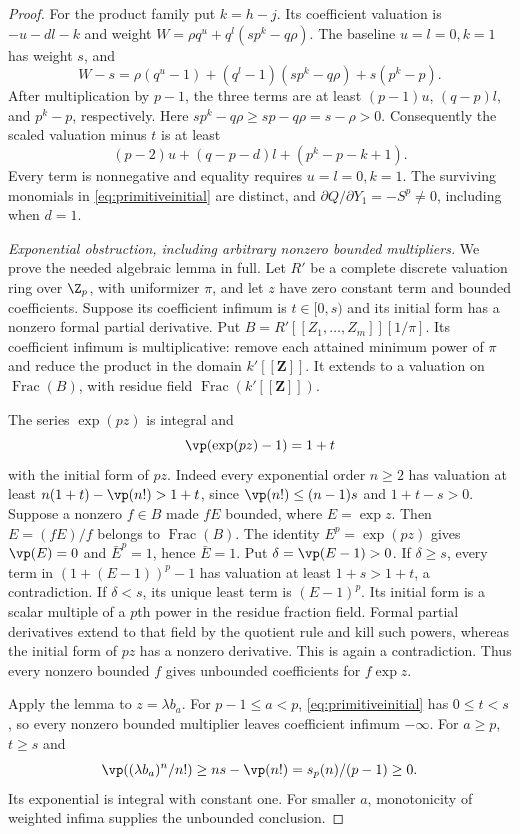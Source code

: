 \begin{proof}
For the product family put $k=h-j$. Its coefficient valuation is $-u-dl-k$ and weight
$W=\rho q^u+q^l(sp^k-q\rho)$. The baseline $u=l=0,k=1$ has weight $s$, and
\[
 W-s=\rho(q^u-1)+(q^l-1)(sp^k-q\rho)+s(p^k-p).
\]
After multiplication by $p-1$, the three terms are at least
$(p-1)u$, $(q-p)l$, and $p^k-p$, respectively. Here
$sp^k-q\rho\ge sp-q\rho=s-\rho>0$.
Consequently the scaled valuation minus $t$ is at least
\[
 (p-2)u+(q-p-d)l+(p^k-p-k+1).
\]
Every term is nonnegative and equality requires $u=l=0,k=1$.
The surviving monomials in \eqref{eq:primitiveinitial} are distinct, and
$\partial Q/\partial Y_1=-S^p\ne0$, including when $d=1$.

\emph{Exponential obstruction, including arbitrary nonzero bounded multipliers.}
We prove the needed algebraic lemma in full. Let $R'$ be a complete discrete valuation ring over $\Z_p$, with uniformizer $\pi$, and let $z$ have zero constant term and bounded coefficients. Suppose its coefficient infimum is $t\in[0,s)$ and its initial form has a nonzero formal partial derivative. Put
$B=R'[[Z_1,\ldots,Z_m]][1/\pi]$.
Its coefficient infimum is multiplicative: remove each attained minimum power of $\pi$ and reduce the product in the domain $k'[[\mathbf Z]]$. It extends to a valuation on $\operatorname{Frac}(B)$, with residue field $\operatorname{Frac}(k'[[\mathbf Z]])$.

The series $\exp(pz)$ is integral and
\[
 \vp(\exp(pz)-1)=1+t
\]
with the initial form of $pz$. Indeed every exponential order $n\ge2$ has valuation at least $n(1+t)-\vp(n!)>1+t$, since
$\vp(n!)\le(n-1)s$ and $1+t-s>0$.
Suppose a nonzero $f\in B$ made $fE$ bounded, where $E=\exp z$.
Then $E=(fE)/f$ belongs to $\operatorname{Frac}(B)$. The identity
$E^p=\exp(pz)$ gives $\vp(E)=0$ and $\bar E^p=1$, hence $\bar E=1$.
Put $\delta=\vp(E-1)>0$. If $\delta\ge s$, every term in
$(1+(E-1))^p-1$ has valuation at least $1+s>1+t$, a contradiction.
If $\delta<s$, its unique least term is $(E-1)^p$. Its initial form is a scalar multiple of a $p$th power in the residue fraction field. Formal partial derivatives extend to that field by the quotient rule and kill such powers, whereas the initial form of $pz$ has a nonzero derivative. This is again a contradiction. Thus every nonzero bounded $f$ gives unbounded coefficients for $f\exp z$.

Apply the lemma to $z=\lambda b_a$. For $p-1\le a<p$, \eqref{eq:primitiveinitial} has $0\le t<s$, so every nonzero bounded multiplier leaves coefficient infimum $-\infty$. For $a\ge p$, $t\ge s$ and
\[
 \vp((\lambda b_a)^n/n!)\ge ns-\vp(n!)
                    =s_p(n)/(p-1)\ge0.
\]
Its exponential is integral with constant one. For smaller $a$, monotonicity of weighted infima supplies the unbounded conclusion.


\end{proof}
